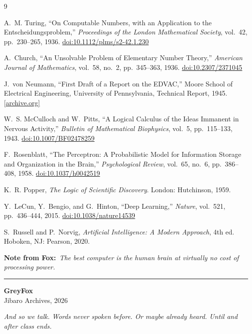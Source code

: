 \documentclass[11pt,a4paper]{article}
\begin{document}
\begin{thebibliography}{9}
\setlength{\itemsep}{0.35em}

A.~M. Turing, ``On Computable Numbers, with an Application to the Entscheidungsproblem,'' \textit{Proceedings of the London Mathematical Society}, vol.~42, pp.~230--265, 1936. \href{https://doi.org/10.1112/plms/s2-42.1.230}{doi:10.1112/plms/s2-42.1.230}

A.~Church, ``An Unsolvable Problem of Elementary Number Theory,'' \textit{American Journal of Mathematics}, vol.~58, no.~2, pp.~345--363, 1936. \href{https://doi.org/10.2307/2371045}{doi:10.2307/2371045}

J.~von Neumann, ``First Draft of a Report on the EDVAC,'' Moore School of Electrical Engineering, University of Pennsylvania, Technical Report, 1945. \href{https://web.archive.org/web/20130314123032/http://qss.stanford.edu/~godfrey/vonNeumann/vnedvac.pdf}{[archive.org]}

W.~S. McCulloch and W.~Pitts, ``A Logical Calculus of the Ideas Immanent in Nervous Activity,'' \textit{Bulletin of Mathematical Biophysics}, vol.~5, pp.~115--133, 1943. \href{https://doi.org/10.1007/BF02478259}{doi:10.1007/BF02478259}

F.~Rosenblatt, ``The Perceptron: A Probabilistic Model for Information Storage and Organization in the Brain,'' \textit{Psychological Review}, vol.~65, no.~6, pp.~386--408, 1958. \href{https://doi.org/10.1037/h0042519}{doi:10.1037/h0042519}

K.~R. Popper, \textit{The Logic of Scientific Discovery}. London: Hutchinson, 1959.

Y.~LeCun, Y.~Bengio, and G.~Hinton, ``Deep Learning,'' \textit{Nature}, vol.~521, pp.~436--444, 2015. \href{https://doi.org/10.1038/nature14539}{doi:10.1038/nature14539}

S.~Russell and P.~Norvig, \textit{Artificial Intelligence: A Modern Approach}, 4th ed. Hoboken, NJ: Pearson, 2020.

\end{thebibliography}

\vspace{0.8em}
\noindent\textbf{Note from Fox:}\ \textit{The best computer is the human brain at virtually no cost of processing power.}

\vspace{0.6em}
\noindent\rule{\textwidth}{0.4pt}

\begin{flushright}
\textbf{GreyFox}\\
{\small\color{gray!60!black} Jibaro Archives, 2026}
\end{flushright}

\vspace{0.4em}
\begin{center}
\itshape\color{gray!50!black} And so we talk. Words never spoken before. Or maybe already heard. Until and after class ends.
\end{center}
\end{document}
